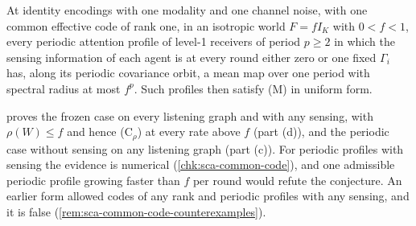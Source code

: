 \begin{conjecture}\label{conj:sca-common-code}
At identity encodings with one modality and one channel noise, with one common effective code of rank one, in an isotropic world $F=fI_K$ with $0<f<1$, every periodic attention profile of level-1 receivers of period $p\ge2$ in which the sensing information of each agent is at every round either zero or one fixed $\Gamma_i$ has, along its periodic covariance orbit, a mean map over one period with spectral radius at most $f^p$. Such profiles then satisfy \textup{(M)} in uniform form.
\end{conjecture}
 proves the frozen case on every listening graph and with any sensing, with $\rho(W)\le f$ and hence \textup{(C$_\rho$)} at every rate above $f$ (part (d)), and the periodic case without sensing on any listening graph (part (c)). For periodic profiles with sensing the evidence is numerical (\cref{chk:sca-common-code}), and one admissible periodic profile growing faster than $f$ per round would refute the conjecture. An earlier form allowed codes of any rank and periodic profiles with any sensing, and it is false (\cref{rem:sca-common-code-counterexamples}).

